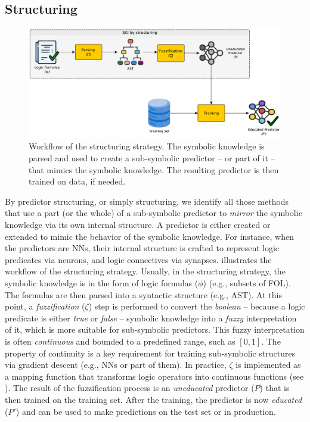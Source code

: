 \subsection{Structuring}\label{subsec:structuring}
%
\begin{figure}
    \centering
    \includegraphics[width=.9\linewidth]{figures/workflow-structuring}
    \caption[Workflow of structuring strategy]{
        Workflow of the structuring strategy.
        The symbolic knowledge is parsed and used to create a sub-symbolic predictor -- or part of it -- that mimics the symbolic knowledge.
        The resulting predictor is then trained on data, if needed.
    }
    \label{fig:workflow-structuring}
\end{figure}
%
By predictor structuring, or simply structuring, we identify all those methods that use a part (or the whole) of a sub-symbolic predictor to \emph{mirror} the symbolic knowledge via its own internal structure.
%
A predictor is either created or extended to mimic the behavior of the symbolic knowledge.
%
For instance, when the predictors are \glspl{NN}, their internal structure is crafted to represent logic predicates via neurons, and logic connectives via synapses.
%
 illustrates the workflow of the structuring strategy.
%
Usually, in the structuring strategy, the symbolic knowledge is in the form of logic formulas ($\phi$) (e.g., subsets of \gls{FOL}).
%
The formulas are then parsed into a syntactic structure (e.g., \gls{AST}).
%
At this point, a \emph{fuzzification} ($\zeta$) step is performed to convert the \emph{boolean} -- because a logic predicate is either \emph{true} or \emph{false} -- symbolic knowledge into a \emph{fuzzy} interpretation of it, which is more suitable for sub-symbolic predictors.
%
This fuzzy interpretation is often \emph{continuous} and bounded to a predefined range, such as \([0, 1]\).
%
The property of continuity is a key requirement for training sub-symbolic structures via gradient descent (e.g., \glspl{NN} or part of them).
%
In practice, $\zeta$ is implemented as a mapping function that transforms logic operators into continuous functions (see ).
%
The result of the fuzzification process is an \emph{uneducated} predictor ($P$) that is then trained on the training set.
%
After the training, the predictor is now \emph{educated} ($P'$) and can be used to make predictions on the test set or in production.
%

